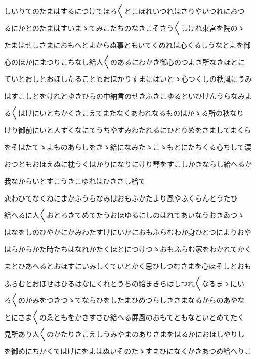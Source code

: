 \documentclass[a4paper,11pt,landscape]{ltjtarticle}
\begin{document}
\par\medskip
しいりてのたまはするにつけてほろ〱とこほれいつれはさりやいつれにおつ
\par\medskip
るにかとのたまはすいまゝてみこたちのなきこそさう〱しけれ東宮を院のゝ
\par\medskip
たまはせしさまにおもへとよからぬ事ともいてくめれは心くるしうなとよを御
\par\medskip
心のほかにまつりこちなし給人〱のあるにわかき御心のつよき所なきほとに
\par\medskip
ていとおしとおほしたることもおほかりすまにはいとゝ心つくしの秋風にうみ
\par\medskip
はすこしとをけれとゆきひらの中納言のせきふきこゆるといひけんうらなみよ
\par\medskip
る〱はけにいとちかくきこえてまたなくあわれなるものはかゝる所の秋なり
\par\medskip
けり御前にいと人すくなにてうちやすみわたれるにひとりめをさましてまくら
\par\medskip
をそはたてゝよものあらしをきゝ給になみたゝこゝもとにたちくる心ちして涙
\par\medskip
おつともおほえぬに枕うくはかりになりにけり琴をすこしかきならし給へるか
\par\medskip
我なからいとすこうきこゆれはひきさし給て
\par\medskip
恋わひてなくねにまかふうらなみはおもふかたより風やふくらんとうたひ
\par\medskip
給へるに人〱おとろきてめてたうおほゆるにしのはれてあいなうおきゐつゝ
\par\medskip
はなをしのひやかにかみわたすけにいかにおもふらむわか身ひとつによりおや
\par\medskip
はらからかた時たちはなれかたくほとにつけつゝおもふらむ家をわかれてかく
\par\medskip
まとひあへるとおほすにいみしくていとかく思ひしつむさまを心ほそしとおも
\par\medskip
ふらむとおほせはひるはなにくれとうちの給まきらはしつれ〱なるまゝにい
\par\medskip
ろ〱のかみをつきつゝてならひをしたまひめつらしきさまなるからのあやな
\par\medskip
とにさま〱のゑともをかきすさひ給へる屏風のおもてともなといとめてたく
\par\medskip
見所あり人〱のかたりきこえしうみやまのありさまをはるかにおほしやりし
\par\medskip
を御めにちかくてはけにをよはぬいそのたゝすまひになくかきあつめ給へりこ
\par\medskip
\end{document}
